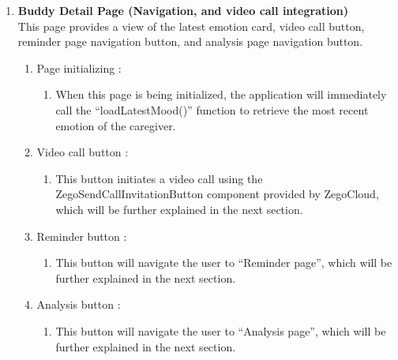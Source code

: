 \begin{enumerate}[leftmargin=2.2cm]
\begin{enumerate}[leftmargin=1.2cm, label=\arabic*.]
		\item Buddy selection :
		\begin{enumerate}[label=\alph*.] 
			\item When the buddy button is clicked, it will navigate to the next page, which is “Buddy detail page”, while passing the selected buddy object. If the buddy is updated and returned, the local list will be refreshed.
		\end{enumerate}
	\end{enumerate}
		
		\item\textbf{Buddy Detail Page (Navigation, and video call integration)} 
		\\This page provides a view of the latest emotion card, video call button, reminder page navigation button, and analysis page navigation button.
		\begin{enumerate}[label=\arabic*.] 
			\item Page initializing :
			\begin{enumerate}[label=\alph*.] 
				\item When this page is being initialized, the application will immediately call the “loadLatestMood()” function to retrieve the most recent emotion of the caregiver.
			\end{enumerate}
			
			\item Video call button :
			\begin{enumerate}[label=\alph*.] 
				\item This button initiates a video call using the ZegoSendCallInvitationButton component provided by ZegoCloud, which will be further explained in the next section.
			\end{enumerate}
			
			\item Reminder button :
			\begin{enumerate}[label=\alph*.] 
				\item This button will navigate the user to “Reminder page”, which will be further explained in the next section.
			\end{enumerate}
			
			\item Analysis button :
			\begin{enumerate}[label=\alph*.] 
				\item This button will navigate the user to “Analysis page”, which will be further explained in the next section.
			\end{enumerate}
		\end{enumerate}
		

\end{enumerate}
